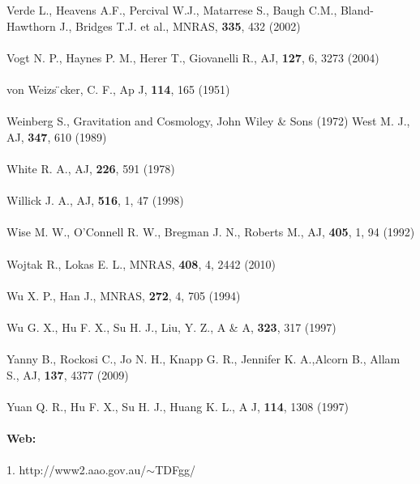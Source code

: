 Verde L., Heavens A.F., Percival W.J., Matarrese S., Baugh C.M., Bland-Hawthorn J., Bridges T.J. et al., MNRAS, \textbf{335}, 432 (2002)\\\\
Vogt N. P., Haynes P. M., Herer T., Giovanelli R., AJ, \textbf{ 127},  6, 3273 (2004)\\\\
von Weizs ̈cker, C. F., Ap J, \textbf{114}, 165 (1951)\\\\
Weinberg S., Gravitation and Cosmology, John Wiley \& Sons (1972)
West M. J., AJ, \textbf{ 347}, 610 (1989)\\\\
White R. A., AJ, \textbf{ 226}, 591 (1978)\\\\
Willick J. A., AJ, \textbf{ 516},  1, 47 (1998)\\\\
Wise M. W., O'Connell R. W., Bregman J. N., Roberts M., AJ, \textbf{ 405},   1, 94 (1992)\\\\
Wojtak R., Lokas E. L., MNRAS, \textbf{ 408},  4, 2442 (2010)\\\\
Wu X. P., Han J., MNRAS, \textbf{ 272},  4, 705 (1994)\\\\
Wu G. X., Hu F. X., Su H. J., Liu, Y. Z., A \& A, \textbf{323}, 317 (1997)\\\\
Yanny B., Rockosi C., Jo N. H., Knapp G. R., Jennifer K. A.,Alcorn B., Allam S., AJ, \textbf{137}, 4377 (2009)\\\\
Yuan Q. R., Hu F. X., Su H. J., Huang K. L., A J, \textbf{114}, 1308 (1997)\\\\
\textbf{\Large{Web:}}\\\\
1. http://www2.aao.gov.au/$\sim$TDFgg/\\
